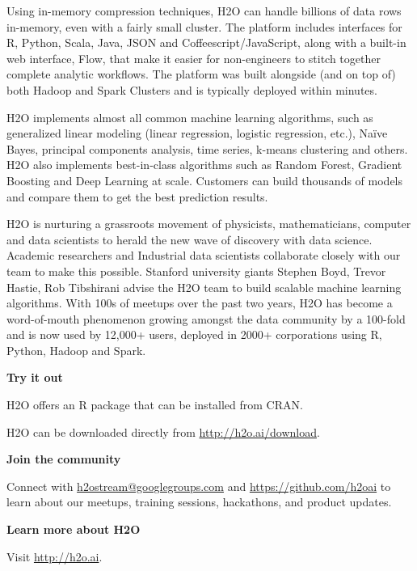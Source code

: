 \documentclass[11pt]{article}
\begin{document}
Using in-memory compression techniques, H2O can handle billions of data rows in-memory, even with a fairly small cluster. The platform includes interfaces for R, Python, Scala, Java, JSON and Coffeescript/JavaScript, along with a built-in  web interface, Flow, that make it easier for non-engineers to stitch together complete analytic workflows. The platform was built alongside (and on top of) both Hadoop and Spark Clusters and is typically deployed within minutes.

H2O implements almost all common machine learning algorithms, such as generalized linear modeling (linear regression, logistic regression, etc.), Na\"{i}ve Bayes, principal components analysis, time series, k-means clustering and others. H2O also implements best-in-class algorithms such as Random Forest, Gradient Boosting and Deep Learning at scale. Customers can build thousands of models and compare them to get the best prediction results.

H2O is nurturing a grassroots movement of physicists, mathematicians, computer and data scientists to herald the new wave of discovery with data science. Academic researchers and Industrial data scientists collaborate closely with our team to make this possible. Stanford university giants Stephen Boyd, Trevor Hastie, Rob Tibshirani advise the H2O team to build scalable machine learning algorithms. With 100s of meetups over the past two years, H2O has become a word-of-mouth phenomenon growing amongst the data community by a 100-fold and is now used by 12,000+ users, deployed in 2000+ corporations using R, Python, Hadoop and Spark.

\textbf{Try it out}

H2O offers an R package that can be installed from CRAN.

H2O can be downloaded directly from \mbox{\url{http://h2o.ai/download}}.

\textbf{Join the community}

Connect with \mbox{\url{h2ostream@googlegroups.com}} and \mbox{\url{https://github.com/h2oai}} to learn about our meetups, training sessions, hackathons, and product updates.

\textbf{Learn more about H2O}

Visit \mbox{\url{http://h2o.ai}}.


\newpage
\end{document}
